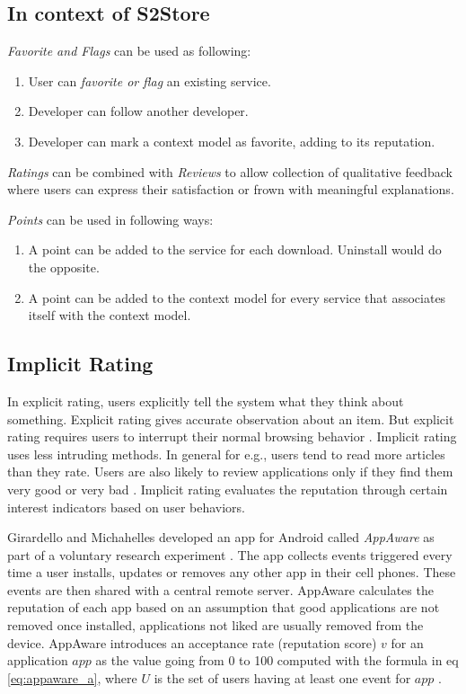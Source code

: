 \subsection*{In context of S2Store}

\emph{Favorite and Flags} can be used as following:
\begin{enumerate}
  \item User can \emph{favorite or flag} an existing service.
  \item Developer can follow another developer.
  \item Developer can mark a context model as favorite, adding to its reputation.
\end{enumerate}

\emph{Ratings} can be combined with \emph{Reviews} to allow collection of qualitative feedback where users can express their satisfaction or frown with meaningful explanations.

\emph{Points} can be used in following ways:

\begin{enumerate}
  \item A point can be added to the service for each download. Uninstall would do the opposite.
  \item A point can be added to the context model for every service that associates itself with the context model.
\end{enumerate}

\subsection{Implicit Rating}
\label{subsec:implicit_rating}

In explicit rating, users explicitly tell the system what they think about something. Explicit rating gives accurate observation about an item. But explicit rating requires users to interrupt their normal browsing behavior \cite{claypool2001inferring}. Implicit rating uses less intruding methods. In general for e.g., users tend to read more articles than they rate. Users are also likely to review applications only if they find them very good or very bad \cite{Podkopajev2012}. Implicit rating evaluates the reputation through certain interest indicators based on user behaviors.

Girardello and Michahelles developed an app for Android called \emph{AppAware} as part of a voluntary research experiment \cite{girardello2010explicit}. The app collects events triggered every time a user installs, updates or removes any other app in their cell phones. These events are then shared with a central remote server. AppAware calculates the reputation of each app based on an assumption that good applications are not removed once installed, applications not liked are usually removed from the device. AppAware introduces an acceptance rate (reputation score) $v$ for an application $app$ as the value going from 0 to 100 computed with the formula in eq \ref{eq:appaware_a}, where $U$ is the set of users having at least one event for $app$ \cite{girardello2010explicit}.

